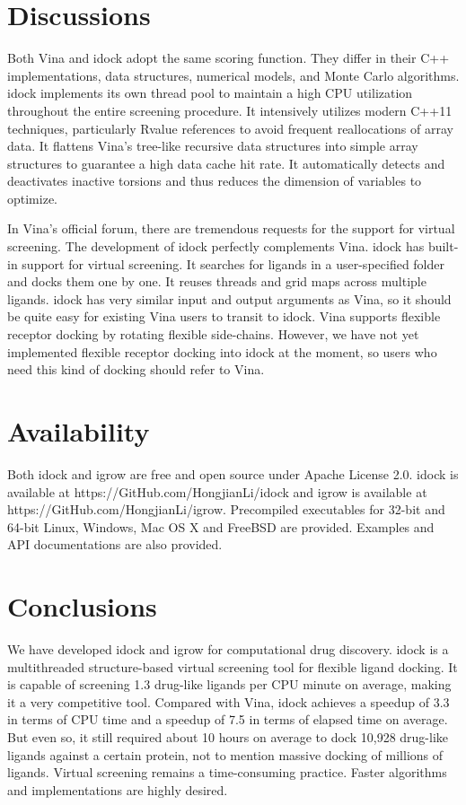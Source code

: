 \documentclass[10pt, conference, compsocconf]{../IEEEtran}
\begin{document}
\section{Discussions}

Both Vina and idock adopt the same scoring function. They differ in their C++ implementations, data structures, numerical models, and Monte Carlo algorithms. idock implements its own thread pool to maintain a high CPU utilization throughout the entire screening procedure. It intensively utilizes modern C++11 techniques, particularly Rvalue references to avoid frequent reallocations of array data. It flattens Vina's tree-like recursive data structures into simple array structures to guarantee a high data cache hit rate. It automatically detects and deactivates inactive torsions and thus reduces the dimension of variables to optimize.

In Vina's official forum, there are tremendous requests for the support for virtual screening. The development of idock perfectly complements Vina. idock has built-in support for virtual screening. It searches for ligands in a user-specified folder and docks them one by one. It reuses threads and grid maps across multiple ligands. idock has very similar input and output arguments as Vina, so it should be quite easy for existing Vina users to transit to idock. Vina supports flexible receptor docking by rotating flexible side-chains. However, we have not yet implemented flexible receptor docking into idock at the moment, so users who need this kind of docking should refer to Vina.

\section{Availability}

Both idock and igrow are free and open source under Apache License 2.0. idock is available at https://GitHub.com/HongjianLi/idock and igrow is available at https://GitHub.com/HongjianLi/igrow. Precompiled executables for 32-bit and 64-bit Linux, Windows, Mac OS X and FreeBSD are provided. Examples and API documentations are also provided.

\section{Conclusions}

We have developed idock and igrow for computational drug discovery. idock is a multithreaded structure-based virtual screening tool for flexible ligand docking. It is capable of screening 1.3 drug-like ligands per CPU minute on average, making it a very competitive tool. Compared with Vina, idock achieves a speedup of 3.3 in terms of CPU time and a speedup of 7.5 in terms of elapsed time on average. But even so, it still required about 10 hours on average to dock 10,928 drug-like ligands against a certain protein, not to mention massive docking of millions of ligands. Virtual screening remains a time-consuming practice. Faster algorithms and implementations are highly desired. 
\end{document}

